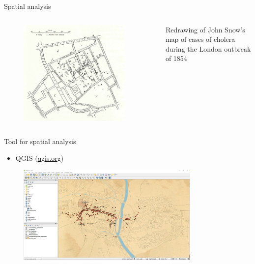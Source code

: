 \documentclass[serif, aspectratio=169]{beamer}
\begin{document}
\begin{frame}
{Spatial analysis}
\begin{columns}
\begin{column}{0.7\textwidth}
\begin{figure}
    \includegraphics[width=0.9\textwidth]{figure/john_snow_map}
\end{figure}
\end{column}
\begin{column}{0.3\textwidth}
Redrawing of John Snow's map of cases of cholera during the London outbreak of 1854 \autocite[24]{tufte_visual_2001}
\end{column}
\end{columns}
\end{frame}

\begin{frame}
{Tool for spatial analysis}

\begin{itemize}

\item QGIS (\url{qgis.org})

\end{itemize}

\begin{figure}
    \includegraphics[width=0.8\textwidth]{figure/qgis}
\end{figure}

\end{frame}


\begin{frame}[allowframebreaks]
\printbibliography
\end{frame}
\end{document}

